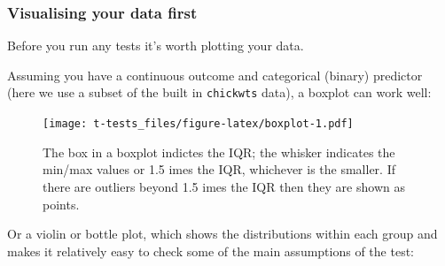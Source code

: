\documentclass[]{article}
\newenvironment{Shaded}{\begin{snugshade}}{\end{snugshade}}
\newcommand{\KeywordTok}[1]{\textcolor[rgb]{0.13,0.29,0.53}{\textbf{#1}}}
\newcommand{\NormalTok}[1]{#1}
\newcommand{\OperatorTok}[1]{\textcolor[rgb]{0.81,0.36,0.00}{\textbf{#1}}}
\newcommand{\StringTok}[1]{\textcolor[rgb]{0.31,0.60,0.02}{#1}}
\begin{document}
\hypertarget{visualising-your-data-first}{%
\subsubsection*{Visualising your data first}\label{visualising-your-data-first}}

Before you run any tests it's worth plotting your data.

Assuming you have a continuous outcome and categorical (binary) predictor (here
we use a subset of the built in \texttt{chickwts} data), a boxplot can work well:

\begin{Shaded}
\end{Shaded}

\begin{figure}
\centering
\texttt{[image: t-tests\_files/figure-latex/boxplot-1.pdf]}
\caption{\label{fig:boxplot}The box in a boxplot indictes the IQR; the whisker indicates the min/max values or 1.5 imes the IQR, whichever is the smaller. If there are outliers beyond 1.5 imes the IQR then they are shown as points.}
\end{figure}

Or a violin or bottle plot, which shows the distributions within each group and
makes it relatively easy to check some of the main assumptions of the test:

\begin{Shaded}
\end{Shaded}
\end{document}
